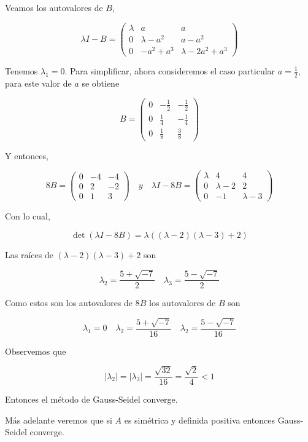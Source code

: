 \documentclass[10pt]{book}
\begin{document}
Veamos los autovalores de $B$,

$$
\lambda I-B=\left(\begin{array}{ccc}
\lambda & a & a \\
0 & \lambda-a^{2} & a-a^{2} \\
0 & -a^{2}+a^{3} & \lambda-2 a^{2}+a^{3}
\end{array}\right)
$$

Tenemos $\lambda_{1}=0$. Para simplificar, ahora consideremos el caso particular $a=\frac{1}{2}$, para este valor de $a$ se obtiene

$$
B=\left(\begin{array}{ccc}
0 & -\frac{1}{2} & -\frac{1}{2} \\
0 & \frac{1}{4} & -\frac{1}{4} \\
0 & \frac{1}{8} & \frac{3}{8}
\end{array}\right)
$$

Y entonces,

$$
8 B=\left(\begin{array}{ccc}
0 & -4 & -4 \\
0 & 2 & -2 \\
0 & 1 & 3
\end{array}\right) \quad y \quad \lambda I-8 B=\left(\begin{array}{ccc}
\lambda & 4 & 4 \\
0 & \lambda-2 & 2 \\
0 & -1 & \lambda-3
\end{array}\right)
$$

Con lo cual,

$$
\operatorname{det}(\lambda I-8 B)=\lambda((\lambda-2)(\lambda-3)+2)
$$

Las raíces de $(\lambda-2)(\lambda-3)+2$ son

$$
\lambda_{2}=\frac{5+\sqrt{-7}}{2} \quad \lambda_{3}=\frac{5-\sqrt{-7}}{2}
$$

Como estos son los autovalores de $8 B$ los autovalores de $B$ son

$$
\lambda_{1}=0 \quad \lambda_{2}=\frac{5+\sqrt{-7}}{16} \quad \lambda_{2}=\frac{5-\sqrt{-7}}{16}
$$

Observemos que

$$
\left|\lambda_{2}\right|=\left|\lambda_{3}\right|=\frac{\sqrt{32}}{16}=\frac{\sqrt{2}}{4}<1
$$

Entonces el método de Gauss-Seidel converge.

Más adelante veremos que si $A$ es simétrica y definida positiva entonces Gauss-Seidel converge.
\end{document}
